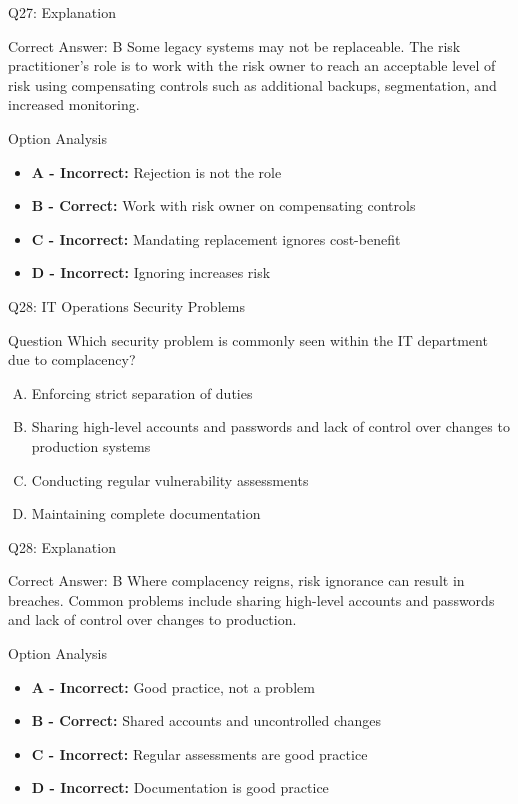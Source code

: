 \documentclass{beamer}
\begin{document}
	\begin{frame}{Q27: Explanation}
		\begin{block}{Correct Answer: B}
			Some legacy systems may not be replaceable. The risk practitioner's role is to work with the risk owner to reach an acceptable level of risk using compensating controls such as additional backups, segmentation, and increased monitoring.
		\end{block}
		\begin{block}{Option Analysis}
			\begin{itemize}
				\item \textbf{A - Incorrect:} Rejection is not the role
				\item \textbf{B - Correct:} Work with risk owner on compensating controls
				\item \textbf{C - Incorrect:} Mandating replacement ignores cost-benefit
				\item \textbf{D - Incorrect:} Ignoring increases risk
			\end{itemize}
		\end{block}
	\end{frame}
	
	\begin{frame}{Q28: IT Operations Security Problems}
		\begin{block}{Question}
			Which security problem is commonly seen within the IT department due to complacency?
		\end{block}
		\begin{enumerate}[(A)]
			\item Enforcing strict separation of duties
			\item Sharing high-level accounts and passwords and lack of control over changes to production systems
			\item Conducting regular vulnerability assessments
			\item Maintaining complete documentation
		\end{enumerate}
	\end{frame}
	
	\begin{frame}{Q28: Explanation}
		\begin{block}{Correct Answer: B}
			Where complacency reigns, risk ignorance can result in breaches. Common problems include sharing high-level accounts and passwords and lack of control over changes to production.
		\end{block}
		\begin{block}{Option Analysis}
			\begin{itemize}
				\item \textbf{A - Incorrect:} Good practice, not a problem
				\item \textbf{B - Correct:} Shared accounts and uncontrolled changes
				\item \textbf{C - Incorrect:} Regular assessments are good practice
				\item \textbf{D - Incorrect:} Documentation is good practice
			\end{itemize}
		\end{block}
	\end{frame}
	
\end{document}
